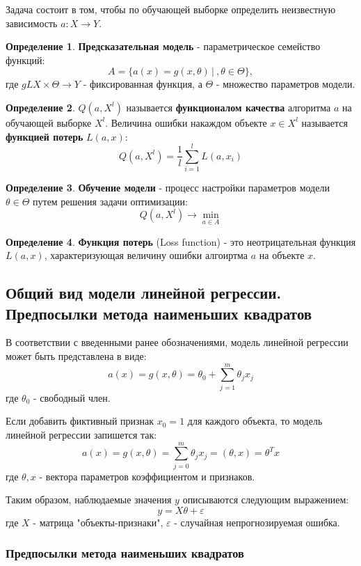 \documentclass[aps,%
12pt,%
final,%
oneside,
onecolumn,%
musixtex, %
superscriptaddress,%
centertags]{article} %
\theoremstyle{plain}
\theoremstyle{definition}
\newtheorem{definition}{Определение}[subsection]
\theoremstyle{remark}
\begin{document}
Задача состоит в том, чтобы по обучающей выборке определить неизвестную зависимость $a: X \to Y$.

\begin{definition}
	\textbf{Предсказательная модель} - параметрическое семейство функций:
	$$A = \{a(x) = g(x,\theta) \, |\ , \theta \in \Theta\},$$
	где $gL X \times \Theta \to Y$ - фиксированная функция, а $\Theta$ - множество параметров модели.
\end{definition}

\begin{definition}
	$Q(a, X^l) $ называется \textbf{функционалом качества} алгоритма $a$ на обучающей выборке $X^l$. Величина ошибки накаждом объекте $x \in X^l$ называется \textbf{функцией потерь} $L(a,x)$:
	$$Q(a,X^l) = \frac{1}{l}\sum\limits_{i=1}^l L(a,x_i)$$
\end{definition}
\begin{definition}
	\textbf{Обучение модели} - процесс настройки параметров модели $\theta \in \Theta$ путем решения задачи оптимизации:
	$$Q(a, X^l) \to \underset{a \in A}{\min}$$
\end{definition}

\begin{definition}
	\textbf{Функция потерь} (Loss function) - это неотрицательная функция $L(a,x)$, характеризующая величину ошибки алгоиртма $a$ на объекте $x$.
\end{definition}

\subsection{Общий вид модели линейной регрессии. Предпосылки метода наименьших квадратов}

В соответствии с введенными ранее обозначениями, модель линейной регрессии может быть представлена в виде:
$$a(x) = g(x,\theta) = \theta_0 + \sum\limits_{j=1}^m \theta_j x_j$$
где $\theta_0$ - свободный член.

Если добавить фиктивный признак $x_0=1$ для каждого объекта, то модель линейной регрессии запишется так:
$$a(x) = g(x,\theta) = \sum\limits_{j=0}^m \theta_jx_j = (\theta, x) = \theta^Tx$$
где $\theta,x $ - вектора параметров коэффициентом и признаков. 

Таким образом, наблюдаемые значения $y$ описываются следующим выражением:
$$y = X \theta + \varepsilon$$
где $X$ - матрица "объекты-признаки", $\varepsilon$ - случайная непрогнозируемая ошибка.

\subsubsection{Предпосылки метода наименьших квадратов}
\end{document}
